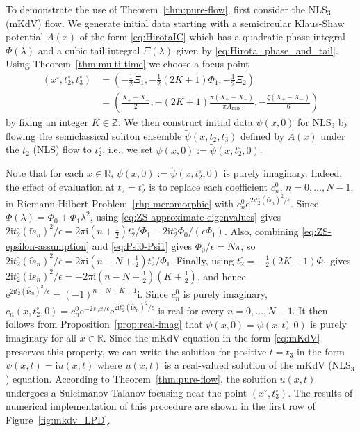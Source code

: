 \documentclass[12pt]{amsart}
\numberwithin{equation}{section}
\newcommand{\ee}{\mathrm{e}}
\newcommand{\ii}{\mathrm{i}}
\newcommand{\SP}{\lambda}
\newcommand{\phaseint}{\Phi}
\newcommand{\tailint}{\Xi}
\newcommand{\Z}{\mathbb{Z}}
\newcommand{\eps}{\epsilon}
\begin{document}
To demonstrate the use of Theorem~\ref{thm:pure-flow}, first consider the NLS$_3$ (mKdV) flow. 
We generate initial data starting with a semicircular Klaus-Shaw potential $A(x)$ of the form \eqref{eq:HirotaIC} which has a quadratic phase integral $\phaseint(\SP)$ and a cubic tail integral $\tailint(\SP)$ given by \eqref{eq:Hirota_phase_and_tail}. 
Using Theorem~\ref{thm:multi-time} we choose a focus point 
\begin{equation}
\begin{split}
	(x^\circ, t_2^\circ, t_3^\circ) &= (-\tfrac{1}{2}\tailint_1,-\tfrac{1}{2}(2K+1)\phaseint_1,-\tfrac{1}{2}\tailint_2)\\
	&=
	\left( \frac{X_+ + X_-}{2}, -(2K+1) \frac{\pi(X_+-X_-)}{\pi A_\mathrm{max}}, -\frac{\xi (X_+ - X_-)}{6} \right)
	\end{split}
\end{equation} 
by fixing an integer $K \in \Z$.
We then construct initial data $\psi(x,0)$ for NLS$_3$ by flowing the semiclassical soliton ensemble $\widetilde{\psi}(x, t_2, t_3)$ defined by $A(x)$ under the $t_2$ (NLS) flow to $t_2^\circ$, i.e., we set $\psi(x,0) := \widetilde{\psi}(x,t_2^\circ, 0)$. 

Note that for each $x\in\mathbb{R}$, $\psi(x,0):=\widetilde{\psi}(x,t_2^\circ,0)$ is purely imaginary.  Indeed, the effect of evaluation at $t_2=t_2^\circ$ is to replace each coefficient $c_n^0$, $n=0,\dots,N-1$, in Riemann-Hilbert Problem~\ref{rhp-meromorphic} with $c_n^0\ee^{2\ii t_2^\circ(\ii \widetilde{s}_n)^2/\eps}$.  Since $\phaseint(\SP)=\phaseint_0+\phaseint_1\lambda^2$, using  \eqref{eq:ZS-approximate-eigenvalues} gives $2\ii t_2^\circ(\ii\widetilde{s}_n)^2/\eps = 2\pi\ii (n+\frac{1}{2})t_2^\circ/\Phi_1-2\ii t_2^\circ\Phi_0/(\eps\Phi_1)$.  Also, combining \eqref{eq:ZS-epsilon-assumption} and \eqref{eq:Psi0-Psi1} gives $\Phi_0/\eps=N\pi$, so $2\ii t_2^\circ(\ii\widetilde{s}_n)^2/\eps = 2\pi\ii (n-N+\frac{1}{2})t_2^\circ/\Phi_1$.  Finally, using $t_2^\circ=-\frac{1}{2}(2K+1)\Phi_1$ gives $2\ii t_2^\circ(\ii\widetilde{s}_n)^2/\eps = -2\pi\ii (n-N+\frac{1}{2})(K+\frac{1}{2})$, and hence $\ee^{2\ii t_2^\circ(\ii\widetilde{s}_n)^2/\eps}=(-1)^{n-N+K+1}\ii$.  Since $c_n^0$ is purely imaginary,  $c_n(x,t_2^\circ,0)=c_n^0\ee^{-2\widetilde{s}_nx/\eps}\ee^{2\ii t_2^\circ(\ii\widetilde{s}_n)^2/\eps}$ is real for every $n=0,\dots,N-1$.  It then follows from Proposition~\ref{prop:real-imag} that $\psi(x,0)=\widetilde{\psi}(x,t_2^\circ,0)$ is purely imaginary for all $x\in\mathbb{R}$.  Since the mKdV equation in the form \eqref{eq:mKdV} preserves this property, we can write the solution for positive $t=t_3$ in the form $\psi(x,t)=\ii u(x,t)$ where $u(x,t)$ is a real-valued solution of the mKdV (NLS$_3$) equation.
According to Theorem~\ref{thm:pure-flow}, the solution $u(x,t)$ undergoes a Suleimanov-Talanov focusing near the point $(x^\circ,t_3^\circ)$.
The results of numerical implementation of this procedure are shown in the first row of Figure~\ref{fig:mkdv_LPD}. 
\end{document}
